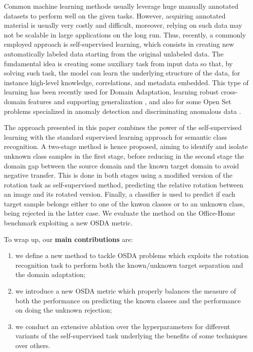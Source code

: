 \documentclass[10pt,twocolumn,letterpaper]{article}
\begin{document}
Common machine learning methods usually leverage huge manually annotated datasets to perform well on the given tasks.
However, acquiring annotated material is usually very costly and difficult, moreover, relying on such data may not be scalable in large applications on the long run.
Thus, recently, a commonly employed approach is self-supervised learning, which consists in creating new automatically labeled data starting from the original unlabeled data.
The fundamental idea is creating some auxiliary task from input data so that,
by solving such task, the model can learn the underlying structure of the data,
for instance high-level knowledge, correlations, and metadata embedded.
This type of learning has been recently used for Domain Adaptation, 
learning robust cross-domain features and supporting generalization \cite{CarlucciJigsaw,SelfSupervisedXu},
and also for some Open Set problems specialized in anomaly detection and discriminating anomalous data \cite{bergman2020classificationbased,dectionGeometric}. 

The approach presented in this paper combines the power of the self-supervised learning with the standard supervised learning approach for semantic class recognition.
A two-stage method is hence proposed, 
aiming to identify and isolate unknown class samples in the first stage, 
before reducing in the second stage the domain gap between the source domain and the known target domain to avoid negative transfer.
This is done in both stages using a modified version of the rotation task as self-supervised method,
predicting the relative rotation between an image and its rotated version.
Finally, a classifier is used to predict if each target sample belongs either to one of the knwon classes or to an unknown class, 
being rejected in the latter case.
We evaluate the method on the Office-Home benchmark \cite{OfficeHomeDataset} exploiting a new OSDA metric. 

To wrap up, our \textbf{main contributions} are: 
\begin{enumerate}
  \item we define a new method to tackle OSDA problems which exploits the rotation recognition task to perform both the known/unknown target separation
and the domain adaptation;
  \item we introduce a new OSDA metric which properly balances the measure of both the performance on predicting the known classes and the performance on doing the unknown rejection;
  \item we conduct an extensive ablation over the hyperparameters for different variants of the self-supervised task underlying the benefits of some techniques over others.
\end{enumerate}
\end{document}
